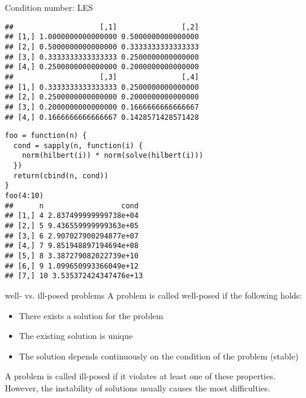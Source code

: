 \documentclass[11pt,compress,t,notes=noshow, xcolor=table]{beamer}
\begin{document}
\begin{vbframe}{Condition number: LES}
\vspace{0.2cm}
\begin{verbatim}
##                    [,1]               [,2]
## [1,] 1.0000000000000000 0.5000000000000000
## [2,] 0.5000000000000000 0.3333333333333333
## [3,] 0.3333333333333333 0.2500000000000000
## [4,] 0.2500000000000000 0.2000000000000000
##                    [,3]               [,4]
## [1,] 0.3333333333333333 0.2500000000000000
## [2,] 0.2500000000000000 0.2000000000000000
## [3,] 0.2000000000000000 0.1666666666666667
## [4,] 0.1666666666666667 0.1428571428571428
\end{verbatim}

\framebreak

\footnotesize
\begin{verbatim}
foo = function(n) {
  cond = sapply(n, function(i) {
    norm(hilbert(i)) * norm(solve(hilbert(i)))
  })
  return(cbind(n, cond))
}
foo(4:10)                                                                                                                                                                                                                
##      n                  cond
## [1,] 4 2.837499999999738e+04
## [2,] 5 9.436559999999363e+05
## [3,] 6 2.907027900294877e+07
## [4,] 7 9.851948897194694e+08
## [5,] 8 3.387279082022739e+10
## [6,] 9 1.099650993366049e+12
## [7,] 10 3.535372424347476e+13
\end{verbatim}

\end{vbframe}


\begin{vbframe}{well- vs. ill-posed problems}
A problem is called well-posed if the following holds:
\begin{itemize}
\item There exists a solution for the problem
\item The existing solution is unique
\item The solution depends continuously on the condition of the problem (stable)
\end{itemize}
A problem is called ill-posed if it violates at least one of these properties. However, the instability of solutions usually causes the most difficulties.
\end{vbframe}
\end{document}
